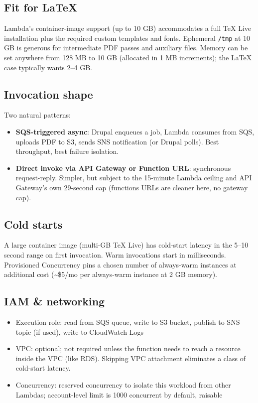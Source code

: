 \documentclass[11pt,letterpaper]{article}
\begin{document}
\subsection{Fit for LaTeX}
Lambda's container-image support (up to 10 GB) accommodates a full TeX Live installation plus the required custom templates and fonts. Ephemeral \texttt{/tmp} at 10 GB is generous for intermediate PDF passes and auxiliary files. Memory can be set anywhere from 128 MB to 10 GB (allocated in 1 MB increments); the LaTeX case typically wants 2--4 GB.

\subsection{Invocation shape}
Two natural patterns:
\begin{itemize}[nosep]
  \item \textbf{SQS-triggered async}: Drupal enqueues a job, Lambda consumes from SQS, uploads PDF to S3, sends SNS notification (or Drupal polls). Best throughput, best failure isolation.
  \item \textbf{Direct invoke via API Gateway or Function URL}: synchronous request-reply. Simpler, but subject to the 15-minute Lambda ceiling and API Gateway's own 29-second cap (functions URLs are cleaner here, no gateway cap).
\end{itemize}

\subsection{Cold starts}
A large container image (multi-GB TeX Live) has cold-start latency in the 5--10 second range on first invocation. Warm invocations start in milliseconds. Provisioned Concurrency pins a chosen number of always-warm instances at additional cost (\textasciitilde \$5/mo per always-warm instance at 2 GB memory).

\subsection{IAM \& networking}
\begin{itemize}[nosep]
  \item Execution role: read from SQS queue, write to S3 bucket, publish to SNS topic (if used), write to CloudWatch Logs
  \item VPC: optional; not required unless the function needs to reach a resource inside the VPC (like RDS). Skipping VPC attachment eliminates a class of cold-start latency.
  \item Concurrency: reserved concurrency to isolate this workload from other Lambdas; account-level limit is 1000 concurrent by default, raisable
\end{itemize}
\end{document}
